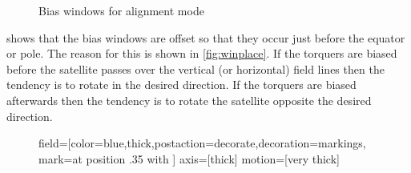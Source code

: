 \begin{figure}[H]
    \centering
    
    \caption{Bias windows for alignment mode}
    \label{fig:windows}
\end{figure}

 shows that the bias windows are offset so that they occur just before the equator or pole. The reason for this is shown in \cref{fig:winplace}. If the torquers are biased before the satellite passes over the vertical (or horizontal) field lines then the tendency is to rotate in the desired direction. If the torquers are biased afterwards then the tendency is to rotate the satellite opposite the desired direction.\cite{Mentch11}

\begin{figure}[htb!]
    \centering
    \newcommand{\cubesat}[2]{
        \draw (#1:#2) node{\pgftext[rotate=#1]{\texttt{[image: cube-icon]}}};
        \draw[->,cyan,axis] (#1:#2) -- +(#1+90:\axlen);
        \draw (#1:#2) ++(#1+90:\axlen) node[rotate=#1-90,anchor=south west] {\tiny +Y};
        \draw[->,red,axis] (#1:#2) -- +(#1:\axlen);
        \draw (#1:#2) ++(#1:\axlen) node[rotate=#1-90,anchor=north west] {\tiny -Z};
    }

    \tikzstyle field=[color=blue,thick,postaction={decorate,decoration={markings,
        mark=at position .35 with {}}}]
    \tikzstyle axis=[thick]
    \tikzstyle motion=[very thick]
    
\end{figure}
